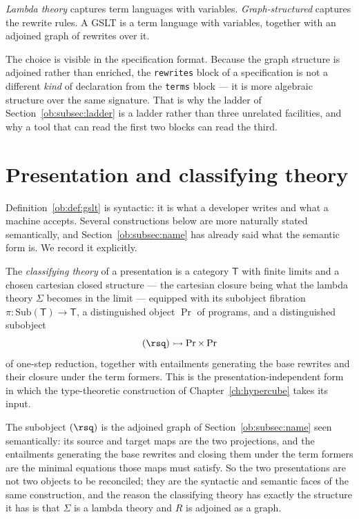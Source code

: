 \begin{remark}
\label{ob:rem:nutshell}
\emph{Lambda theory} captures term languages with variables. \emph{Graph-structured}
captures the rewrite rules. A GSLT is a term language with variables, together with an
adjoined graph of rewrites over it.
\end{remark}

\begin{remark}
The choice is visible in the specification format. Because the graph structure is
adjoined rather than enriched, the \texttt{rewrites} block of a specification is not a
different \emph{kind} of declaration from the \texttt{terms} block --- it is more
algebraic structure over the same signature. That is why the ladder of
Section~\ref{ob:subsec:ladder} is a ladder rather than three unrelated facilities, and why a
tool that can read the first two blocks can read the third.
\end{remark}

\section{Presentation and classifying theory}
\label{ob:subsec:classifying}

Definition~\ref{ob:def:gslt} is syntactic: it is what a developer writes and what a machine
accepts. Several constructions below are more naturally stated semantically, and
Section~\ref{ob:subsec:name} has already said what the semantic form is. We record it
explicitly.

The \emph{classifying theory} of a presentation is a category $\mathsf{T}$ with finite
limits and a chosen cartesian closed structure --- the cartesian closure being what the
lambda theory $\Sigma$ becomes in the limit --- equipped with its subobject fibration
$\pi : \mathrm{Sub}(\mathsf{T}) \to \mathsf{T}$, a distinguished object $\Pr$ of
programs, and a distinguished subobject
\[
  (\rsq) \rightarrowtail \Pr \times \Pr
\]
of one-step reduction, together with entailments generating the base rewrites and their
closure under the term formers. This is the presentation-independent form in which the
type-theoretic construction of Chapter~\ref{ch:hypercube} takes its input.

The subobject $(\rsq)$ is the adjoined graph of Section~\ref{ob:subsec:name} seen
semantically: its source and target maps are the two projections, and the entailments
generating the base rewrites and closing them under the term formers are the minimal
equations those maps must satisfy. So the two presentations are not two objects to be
reconciled; they are the syntactic and semantic faces of the same construction, and the
reason the classifying theory has exactly the structure it has is that $\Sigma$ is a
lambda theory and $R$ is adjoined as a graph.

